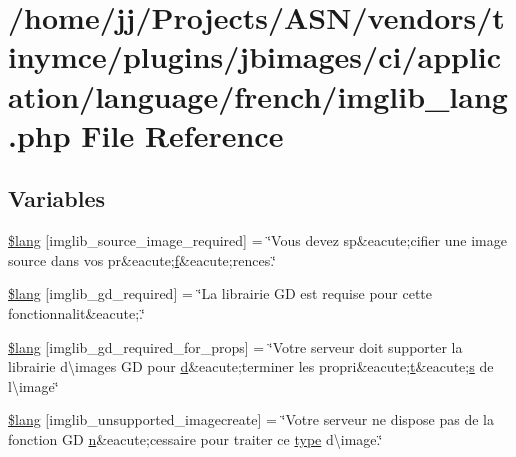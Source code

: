 \hypertarget{application_2language_2french_2imglib__lang_8php}{}\section{/home/jj/\+Projects/\+A\+S\+N/vendors/tinymce/plugins/jbimages/ci/application/language/french/imglib\+\_\+lang.php File Reference}
\label{application_2language_2french_2imglib__lang_8php}
\subsection*{Variables}
\begin{DoxyCompactItemize}
\item 
\hyperlink{application_2language_2french_2imglib__lang_8php_af48787ab142f633036ebdf1cc5da7409}{\$lang} \mbox{[}\textquotesingle{}imglib\+\_\+source\+\_\+image\+\_\+required\textquotesingle{}\mbox{]} = \char`\"{}Vous devez sp\&eacute;cifier une image source dans vos pr\&eacute;\hyperlink{jquery-ui_8min_8js_a9cf09a2972472098a4c689fd988f4dfc}{f}\&eacute;rences.\char`\"{}
\item 
\hyperlink{application_2language_2french_2imglib__lang_8php_aa8d7f8276e62fbe759daef2021c16552}{\$lang} \mbox{[}\textquotesingle{}imglib\+\_\+gd\+\_\+required\textquotesingle{}\mbox{]} = \char`\"{}La librairie GD est requise pour cette fonctionnalit\&eacute;.\char`\"{}
\item 
\hyperlink{application_2language_2french_2imglib__lang_8php_a0da9c99f9e2b5f38ccbefb9d9f702c5e}{\$lang} \mbox{[}\textquotesingle{}imglib\+\_\+gd\+\_\+required\+\_\+for\+\_\+props\textquotesingle{}\mbox{]} = \char`\"{}Votre serveur doit supporter la librairie d\textbackslash{}\textquotesingle{}images GD pour \hyperlink{fullpage_2plugin_8min_8js_a86138ad7596633fd5f960ad9c40f8862}{d}\&eacute;terminer les propri\&eacute;\hyperlink{jquery-ui_8min_8js_acf335ef347969ef6dc8387e680fb289e}{t}\&eacute;\hyperlink{paste_2plugin_8min_8js_a43ae144ee2a4e493fea41ca42f795b14}{s} de l\textbackslash{}\textquotesingle{}image\char`\"{}
\item 
\hyperlink{application_2language_2french_2imglib__lang_8php_ace032cbe8dafb1f3417a758d0914ecdb}{\$lang} \mbox{[}\textquotesingle{}imglib\+\_\+unsupported\+\_\+imagecreate\textquotesingle{}\mbox{]} = \char`\"{}Votre serveur ne dispose pas de la fonction GD \hyperlink{fullpage_2plugin_8min_8js_ab767a859d1217315f42c9bb52fc648dc}{n}\&eacute;cessaire pour traiter ce \hyperlink{_ossn_wall_2actions_2wall_2post_2group_8php_a2dc1bb4e1ed0029daa81ac0776b14b51}{type} d\textbackslash{}\textquotesingle{}image.\char`\"{}

\end{DoxyCompactItemize}
